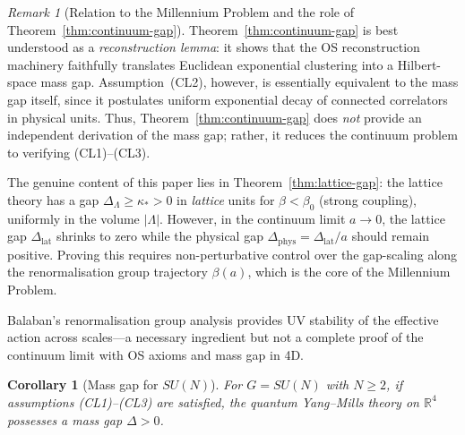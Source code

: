 \documentclass[12pt,a4paper]{article}
\theoremstyle{definition}
\theoremstyle{plain}
\newtheorem{corollary}[definition]{Corollary}
\theoremstyle{remark}
\newtheorem{remark}[definition]{Remark}
\begin{document}
\begin{remark}[Relation to the Millennium Problem and the role of Theorem~\ref{thm:continuum-gap}]
Theorem~\ref{thm:continuum-gap} is best understood as a \emph{reconstruction lemma}: it shows that the OS reconstruction machinery faithfully translates Euclidean exponential clustering into a Hilbert-space mass gap. Assumption~(CL2), however, is essentially equivalent to the mass gap itself, since it postulates uniform exponential decay of connected correlators in physical units. Thus, Theorem~\ref{thm:continuum-gap} does \emph{not} provide an independent derivation of the mass gap; rather, it reduces the continuum problem to verifying (CL1)--(CL3).

The genuine content of this paper lies in Theorem~\ref{thm:lattice-gap}: the lattice theory has a gap $\Delta_\Lambda \geq \kappa_* > 0$ in \emph{lattice} units for $\beta < \beta_0$ (strong coupling), uniformly in the volume $|\Lambda|$. However, in the continuum limit $a \to 0$, the lattice gap $\Delta_{\mathrm{lat}}$ shrinks to zero while the physical gap $\Delta_{\mathrm{phys}} = \Delta_{\mathrm{lat}}/a$ should remain positive. Proving this requires non-perturbative control over the gap-scaling along the renormalisation group trajectory $\beta(a)$, which is the core of the Millennium Problem.

Balaban's renormalisation group analysis \cite{Balaban1985a, Balaban1985b, Balaban1984c} provides UV stability of the effective action across scales---a necessary ingredient but not a complete proof of the continuum limit with OS axioms and mass gap in 4D.
\end{remark}

\begin{corollary}[Mass gap for $SU(N)$]
For $G = SU(N)$ with $N \geq 2$, if assumptions (CL1)--(CL3) are satisfied, the quantum Yang--Mills theory on $\mathbb{R}^4$ possesses a mass gap $\Delta > 0$.
\end{corollary}

\end{document}
